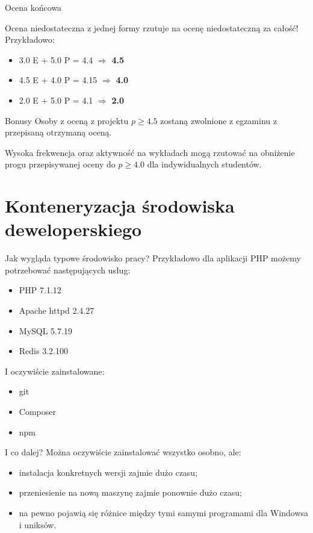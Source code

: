 \begin{frame}{Ocena końcowa}
	\begin{figure}
	\end{figure}
	
	Ocena niedostateczna z jednej formy rzutuje na ocenę niedostateczną za całość! Przykładowo:
	\begin{itemize}
		\item 3.0 E + 5.0 P = 4.4 $\Rightarrow$ \textbf{4.5}
		\item 4.5 E + 4.0 P = 4.15 $\Rightarrow$ \textbf{4.0}
		\item 2.0 E + 5.0 P = 4.1 $\Rightarrow$ \textbf{2.0}
	\end{itemize}
\end{frame}

\begin{frame}{Bonusy}	
	Osoby z oceną z projektu $p \geq 4.5$ zostaną zwolnione z egzaminu z przepisaną otrzymaną oceną.
	
	Wysoka frekwencja oraz aktywność na wykładach mogą rzutować na obniżenie progu przepisywanej oceny do $p \geq 4.0$ dla indywidualnych studentów.
\end{frame}

\section{Konteneryzacja środowiska deweloperskiego}

\begin{frame}{Jak wygląda typowe środowisko pracy?}
	Przykładowo dla aplikacji PHP możemy potrzebować następujących usług:
	\begin{itemize}
		\item PHP 7.1.12
		\item Apache httpd 2.4.27
		\item MySQL 5.7.19
		\item Redis 3.2.100
	\end{itemize}
	
	I oczywiście zainstalowane:
	\begin{itemize}
		\item git
		\item Composer
		\item npm
	\end{itemize}
\end{frame}

\begin{frame}{I co dalej?}
	Można oczywiście zainstalować wszystko osobno, ale:
	\begin{itemize}
		\item instalacja konkretnych wersji zajmie dużo czasu;
		\item przeniesienie na nową maszynę zajmie ponownie dużo czasu;
		\item na pewno pojawią się różnice między tymi samymi programami dla Windowsa i uniksów.
	\end{itemize}
\end{frame}

